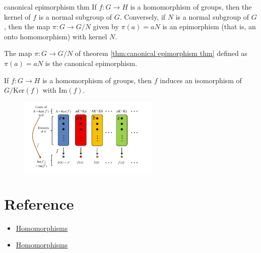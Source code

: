 \begin{theorem}{}{canonical epimorphism thm}
    If $f:G\rightarrow H$ is a homomorphism of groups,
    then the kernel of $f$ is a normal subgroup of $G$. Conversely,
    if $N$ is a normal subgroup of $G$,
    then the map $\pi: G\rightarrow G/N$ given by $\pi(a)=aN$ is an epimorphism
    (that is, an onto homomorphism) with kernel $N$.
\end{theorem}

\begin{definition}{}{}
    The map $\pi:G\rightarrow G/N$ of theorem \ref{thm:canonical epimorphism thm}
    defined as $\pi(a)=aN$ is the canonical epimorphism.
\end{definition}

\begin{theorem}{}{}
    If $f : G \rightarrow H$ 
    is a homomorphism of groups, 
    then $f$ induces an isomorphism of
    $G/\text{Ker}(f)$ with $\text{Im}(f)$. 
\end{theorem}

\begin{figure}[H]
    \centering
    \includegraphics[width=0.6\textwidth]{figure/isomorphism.png}
    \caption{}
\end{figure}

\section{Reference}

\begin{itemize}
    \item \href{https://faculty.etsu.edu/gardnerr/5410/notes/I-2.pdf}{Homomorphisms}
    \item \href{https://faculty.etsu.edu/gardnerr/5410/notes/I-5.pdf}{Homomorphisms}
\end{itemize}

